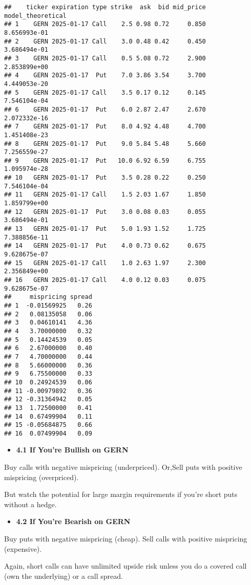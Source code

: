 \documentclass[
]{article}
\providecommand{\tightlist}{%
  \setlength{\itemsep}{0pt}\setlength{\parskip}{0pt}}
\begin{document}
\begin{verbatim}
##    ticker expiration type strike  ask  bid mid_price model_theoretical
## 1    GERN 2025-01-17 Call    2.5 0.98 0.72     0.850      8.656993e-01
## 2    GERN 2025-01-17 Call    3.0 0.48 0.42     0.450      3.686494e-01
## 3    GERN 2025-01-17 Call    0.5 5.08 0.72     2.900      2.853899e+00
## 4    GERN 2025-01-17  Put    7.0 3.86 3.54     3.700      4.449053e-20
## 5    GERN 2025-01-17 Call    3.5 0.17 0.12     0.145      7.546104e-04
## 6    GERN 2025-01-17  Put    6.0 2.87 2.47     2.670      2.072332e-16
## 7    GERN 2025-01-17  Put    8.0 4.92 4.48     4.700      1.451408e-23
## 8    GERN 2025-01-17  Put    9.0 5.84 5.48     5.660      7.256559e-27
## 9    GERN 2025-01-17  Put   10.0 6.92 6.59     6.755      1.095974e-28
## 10   GERN 2025-01-17  Put    3.5 0.28 0.22     0.250      7.546104e-04
## 11   GERN 2025-01-17 Call    1.5 2.03 1.67     1.850      1.859799e+00
## 12   GERN 2025-01-17  Put    3.0 0.08 0.03     0.055      3.686494e-01
## 13   GERN 2025-01-17  Put    5.0 1.93 1.52     1.725      7.388856e-11
## 14   GERN 2025-01-17  Put    4.0 0.73 0.62     0.675      9.628675e-07
## 15   GERN 2025-01-17 Call    1.0 2.63 1.97     2.300      2.356849e+00
## 16   GERN 2025-01-17 Call    4.0 0.12 0.03     0.075      9.628675e-07
##     mispricing spread
## 1  -0.01569925   0.26
## 2   0.08135058   0.06
## 3   0.04610141   4.36
## 4   3.70000000   0.32
## 5   0.14424539   0.05
## 6   2.67000000   0.40
## 7   4.70000000   0.44
## 8   5.66000000   0.36
## 9   6.75500000   0.33
## 10  0.24924539   0.06
## 11 -0.00979892   0.36
## 12 -0.31364942   0.05
## 13  1.72500000   0.41
## 14  0.67499904   0.11
## 15 -0.05684875   0.66
## 16  0.07499904   0.09
\end{verbatim}

\begin{itemize}
\tightlist
\item
  \textbf{4.1 If You're Bullish on GERN}
\end{itemize}

Buy calls with negative mispricing (underpriced). Or,Sell puts with
positive mispricing (overpriced).

But watch the potential for large margin requirements if you're short
puts without a hedge.

\begin{itemize}
\tightlist
\item
  \textbf{4.2 If You're Bearish on GERN}
\end{itemize}

Buy puts with negative mispricing (cheap). Sell calls with positive
mispricing (expensive).

Again, short calls can have unlimited upside risk unless you do a
covered call (own the underlying) or a call spread.
\end{document}
